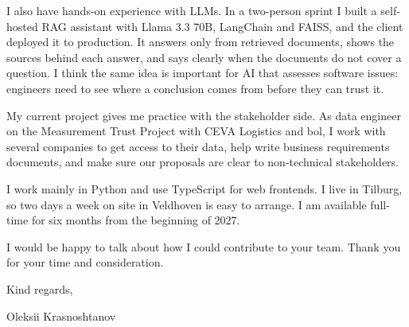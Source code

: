 \documentclass[letterpaper,11pt]{article}
\begin{document}
I also have hands-on experience with LLMs. In a two-person sprint I built a
self-hosted RAG assistant with Llama 3.3 70B, LangChain and FAISS, and the
client deployed it to production. It answers only from retrieved documents,
shows the sources behind each answer, and says clearly when the documents do
not cover a question. I think the same idea is important for AI that assesses
software issues: engineers need to see where a conclusion comes from before
they can trust it.

My current project gives me practice with the stakeholder side. As data
engineer on the Measurement Trust Project with CEVA Logistics and bol, I work
with several companies to get access to their data, help write business
requirements documents, and make sure our proposals are clear to non-technical
stakeholders.

I work mainly in Python and use TypeScript for web frontends. I live in
Tilburg, so two days a week on site in Veldhoven is easy to arrange. I am
available full-time for six months from the beginning of 2027.

I would be happy to talk about how I could contribute to your team. Thank you
for your time and consideration.

Kind regards,

Oleksii Krasnoshtanov
\end{document}
